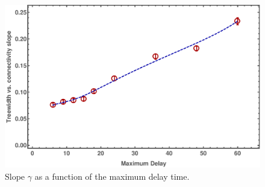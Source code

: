 \begin{figure}[h]
\includegraphics[width=\columnwidth]{pics/instances/treewidth_pl.pdf}
\caption[Treewidth-size correlation coefficient vs. $d_{\max}$]{Slope $\gamma$ as a function
  of the maximum delay time.}
\label{fig:treewidth-size-correlation}
\end{figure}
